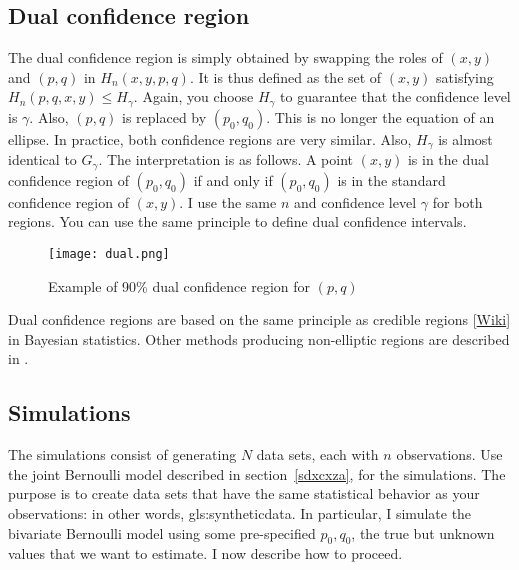 \documentclass[oneside,10pt]{book}
\begin{document}
\subsection{Dual confidence region}

The \textcolor{index}{dual confidence region} is simply obtained by swapping the roles of $(x, y)$ and $(p, q)$ in $H_n(x, y, p, q)$. It is thus defined as the set of $(x, y)$ satisfying $H_n(p, q, x, y) \leq H_\gamma$. Again, you choose $H_\gamma$ to guarantee that the confidence level is $\gamma$. Also, $(p, q)$ is replaced by $(p_0, q_0)$. This is no longer the equation of an ellipse. In practice, both confidence regions are very similar. Also, $H_\gamma$ is almost identical to $G_\gamma$. The interpretation is as follows. A point $(x, y)$ is in the dual confidence region of $(p_0, q_0)$ if and only if $(p_0, q_0)$ is in the standard confidence region of $(x, y)$. I use the same $n$ and confidence level $\gamma$ for both regions. You can use the same principle to define dual confidence intervals.

\begin{figure}%
\centering
\texttt{[image: dual.png]} %
\caption{Example of 90\% dual confidence region for $(p, q)$}
\label{fig:pbcixccx}
\end{figure}

Dual confidence regions are based on the same principle as \textcolor{index}{credible regions} [\href{https://en.wikipedia.org/wiki/Credible_interval}{Wiki}] in Bayesian statistics. Other methods producing non-elliptic regions are described in \cite{ploshu2013}.


\subsection{Simulations} \label{simulpetes}

The simulations consist of generating $N$ data sets, each with $n$ observations. Use the joint Bernoulli model described in  section~\ref{sdxcxza}, for the simulations. The purpose is to create data sets that have the same statistical behavior as your observations:
 in other words, \gls{gls:syntheticdata}. In particular, I simulate the bivariate Bernoulli model using some pre-specified $p_0, q_0$, the true but unknown values that we want to estimate.  I now describe how to proceed.
\end{document}
